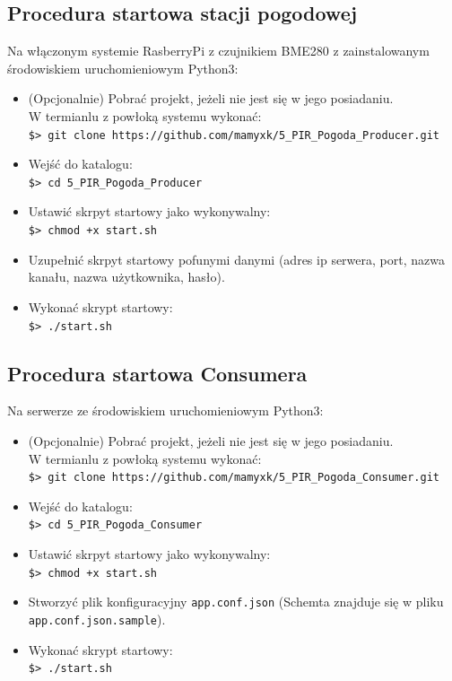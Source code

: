 \documentclass[12pt,a4paper]{article}
\begin{document}
    \subsection{Procedura startowa stacji pogodowej}
    Na włączonym systemie RasberryPi z czujnikiem BME280 z zainstalowanym środowiskiem uruchomieniowym Python3:
    \begin{itemize}
        \item (Opcjonalnie) Pobrać projekt, jeżeli nie jest się w jego posiadaniu. \\ W termianlu z powłoką systemu wykonać:\\ \texttt{\$> git clone https://github.com/mamyxk/5\_PIR\_Pogoda\_Producer.git}
        \item Wejść do katalogu: \\\texttt{\$> cd 5\_PIR\_Pogoda\_Producer}
        \item Ustawić skrpyt startowy jako wykonywalny:\\ \texttt{\$> chmod +x start.sh}
        \item Uzupełnić skrpyt startowy pofunymi danymi (adres ip serwera, port, nazwa kanału, nazwa użytkownika, hasło).
        \item Wykonać skrypt startowy: \\ \texttt{\$> ./start.sh}
    \end{itemize}

    \subsection{Procedura startowa Consumera}
    Na serwerze ze środowiskiem uruchomieniowym Python3:
    \begin{itemize}
        \item (Opcjonalnie) Pobrać projekt, jeżeli nie jest się w jego posiadaniu. \\ W termianlu z powłoką systemu wykonać:\\ \texttt{\$> git clone https://github.com/mamyxk/5\_PIR\_Pogoda\_Consumer.git}
        \item Wejść do katalogu: \\\texttt{\$> cd 5\_PIR\_Pogoda\_Consumer}
        \item Ustawić skrpyt startowy jako wykonywalny:\\ \texttt{\$> chmod +x start.sh}
        \item Stworzyć plik konfiguracyjny \texttt{app.conf.json} (Schemta znajduje się w pliku \texttt{app.conf.json.sample}).
        \item Wykonać skrypt startowy: \\ \texttt{\$> ./start.sh}
    \end{itemize}
\end{document}
